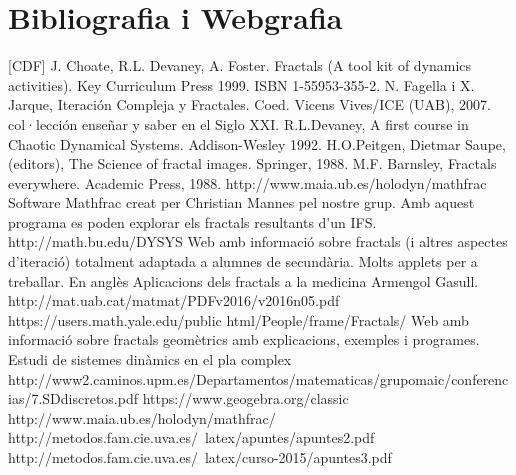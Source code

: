 \documentclass[12pt]{report}
\begin{document}
\section{Bibliografia i Webgrafia}
[CDF] J. Choate, R.L. Devaney, A. Foster. Fractals (A tool kit of dynamics activities).
Key Curriculum Press 1999. ISBN 1-55953-355-2.
\newline
\newline
[FJ] N. Fagella i X. Jarque, Iteración Compleja y Fractales. Coed. Vicens Vives/ICE
(UAB), 2007. col·lección enseñar y saber en el Siglo XXI.
\newline
\newline
[D] R.L.Devaney, A first course in Chaotic Dynamical Systems. Addison-Wesley
1992.
\newline
\newline
[P] H.O.Peitgen, Dietmar Saupe, (editors), The Science of fractal images. Springer,
1988.
\newline
\newline
[B] M.F. Barnsley, Fractals everywhere. Academic Press, 1988.
\newline
\newline
[MF] http://www.maia.ub.es/holodyn/mathfrac Software Mathfrac creat per
Christian Mannes pel nostre grup. Amb aquest programa es poden explorar
els fractals resultants d’un IFS.
\newline
\newline
[W1] http://math.bu.edu/DYSYS Web amb informació sobre fractals (i altres
aspectes d'iteració) totalment adaptada a alumnes de secundària. Molts applets
per a treballar. En anglès
\newline
\newline
[W2] Aplicacions dels fractals a la medicina Armengol Gasull.
\newline
http://mat.uab.cat/matmat/PDFv2016/v2016n05.pdf
\newline
\newline
[W3] https://users.math.yale.edu/public html/People/frame/Fractals/
Web amb informació sobre fractals geomètrics amb explicacions, exemples i
programes.
\newline
\newline
Estudi de sistemes dinàmics en el pla complex
\newline
\newline
http://www2.caminos.upm.es/Departamentos/matematicas/grupomaic/conferencias/7.SDdiscretos.pdf
\newline
\newline
https://www.geogebra.org/classic
\newline
\newline
http://www.maia.ub.es/holodyn/mathfrac/
\newline
\newline
http://metodos.fam.cie.uva.es/~latex/apuntes/apuntes2.pdf
\newline
\newline
http://metodos.fam.cie.uva.es/~latex/curso-2015/apuntes3.pdf
\newline 
\newline
\end{document}
